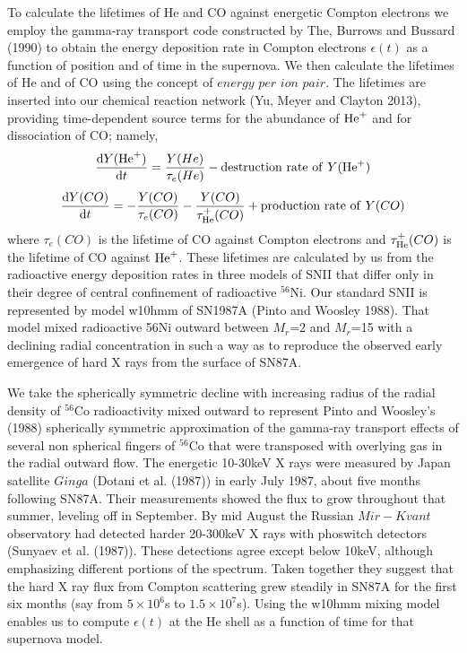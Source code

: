 \documentclass[manuscript]{aastex}
\newcommand{\hep}{{\rm He}^+}
\begin{document}
To calculate the lifetimes of He and CO against energetic Compton electrons 
we employ the gamma-ray transport code constructed by 
The, Burrows and Bussard (1990) to obtain the energy deposition 
rate in Compton electrons $\epsilon(t)$ as a function of position and of time 
in the supernova. We then calculate the lifetimes of He and of CO using the 
concept of $energy$ $per$ $ion$ $pair$. The lifetimes are inserted into 
our chemical 
reaction network (Yu, Meyer and Clayton 2013), providing time-dependent source 
terms for the abundance of $\hep$ and for dissociation of CO; namely,
\begin{equation}
\frac {{\rm d}Y(\hep)} {{\rm d}t} =
  \frac {Y(He)}{\tau_e(He)} - {\rm destruction\ rate\ of\ }Y(\hep)
\end{equation}
\begin{equation}
\frac {{\rm d}Y(CO)} {{\rm d}t} =
  -\frac {Y(CO)}{\tau_e(CO)} - 
  \frac {Y(CO)}{\tau_\hep(CO)} + 
  {\rm production\ rate\ of\ }Y(CO)
\end{equation}
where $\tau_e(CO)$ is the lifetime of CO against Compton electrons and 
$\tau_\hep(CO)$ is the lifetime of CO against $\hep$. These lifetimes are 
calculated by us from the radioactive energy deposition rates in three 
models of SNII that differ only in their degree of central confinement of 
radioactive $^{56}$Ni. Our standard SNII is represented by model w10hmm of 
SN1987A (Pinto and Woosley 1988). That model mixed radioactive 
56Ni outward between $M_r$=2 and $M_r$=15 with a declining radial 
concentration in such a way as to reproduce the observed early emergence of 
hard X rays from the surface of SN87A. 
  
We take the spherically symmetric decline with increasing radius of 
the radial  density of $^{56}$Co radioactivity mixed outward to represent 
Pinto and Woosley’s (1988)  spherically symmetric approximation 
of the gamma-ray transport effects of several non spherical fingers of 
$^{56}$Co that were transposed with overlying gas in the radial outward flow. 
The energetic 10-30keV X rays were measured by Japan satellite $Ginga$ 
(Dotani et al. (1987)) in early July 1987, about five months following 
SN87A. Their measurements showed the flux to grow throughout that summer, 
leveling off in September. By mid August the Russian $Mir-Kvant$ observatory 
had detected harder 20-300keV X rays with phoswitch detectors 
(Sunyaev et al. (1987)). These detections agree except below 10keV, 
although emphasizing different portions of the spectrum. Taken together they 
suggest that the hard X ray flux from Compton scattering grew steadily in 
SN87A for the first six months (say from $5\times 10^6$s to $1.5\times 10^7$s). 
Using the w10hmm mixing model enables us to compute $\epsilon(t)$ at the He 
shell as a function of time for that supernova model.
\end{document}
